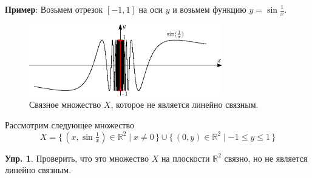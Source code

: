 \documentclass[12pt]{article}
\newcommand{\MR}{\mathbb{R}}
\theoremstyle{definition}
\newtheorem{exrc}{Упр.}
\begin{document}
\textbf{Пример}: Возьмем отрезок $[-1,1]$ на оси $y$ и возьмем функцию $y = \sin{\frac{1}{x}}$.
\begin{figure}[H]
	\centering
	\includegraphics[width=0.75\textwidth]{11_1.eps}
	\caption{Связное множество $X$, которое не является линейно связным.}
	\label{11_1}
\end{figure}
Рассмотрим следующее множество 
$$
	X = \{\,(x, \sin{\tfrac{1}{x}}) \in \MR^2 \mid x \neq 0 \,\} \cup \{\, (0,y) \in 	\MR^2  \mid -1 \leq y \leq 1 \,\}
$$
\begin{exrc}
	Проверить, что это множество $X$ на плоскости $\MR^2$ связно, но не является линейно связным.
\end{exrc}
\end{document}
